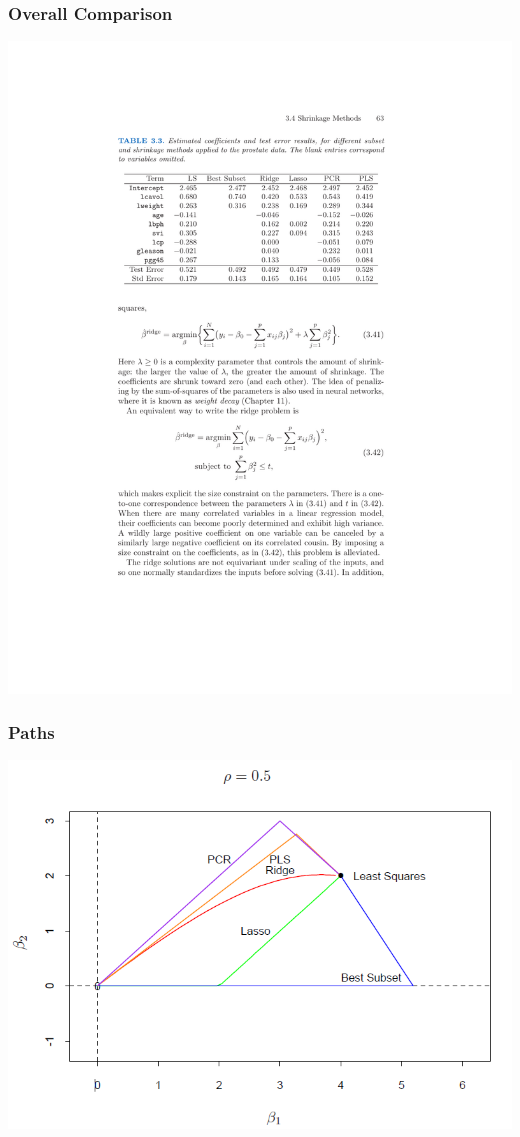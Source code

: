\begin{frame}
    \frametitle{Overall Comparison}
    \begin{center}
    \includegraphics[width=\textwidth]{./resources/regressiontable}
    \end{center}
\end{frame}
    
\begin{frame}
    \frametitle{Paths}
    \begin{center}
    \includegraphics[width=\textwidth]{./resources/ESLshrinkpathPositive}
    \end{center}
\end{frame}

